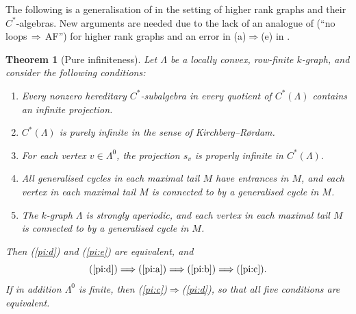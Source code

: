 \documentclass[12pt]{amsart}
\theoremstyle{plain}
\newtheorem{theorem}{Theorem}[section]
\theoremstyle{definition}
\theoremstyle{remark}
\begin{document}
The following is a generalisation of \cite[Theorem 2.3]{HS} in the setting of higher rank graphs and their $C^*$-algebras. New arguments are needed due to the lack of an analogue of \cite[Corollary 2.8]{KPR} (``no loops$\,\Rightarrow\,$AF'') for higher rank graphs  and an error in (a)$\Rightarrow$(e) in \cite[Theorem 2.3]{HS}.
\begin{theorem}[Pure infiniteness]\label{thm:pure-inf}
Let $\Lambda$ be a locally convex, row-finite $k$-graph, and consider the
following conditions:
\begin{enumerate}%
    \item\label{pi:a}
    Every nonzero hereditary $C^*$-subalgebra in every quotient of
    $C^*(\Lambda)$ contains an infinite projection.

    \item\label{pi:b}
    $C^*(\Lambda)$ is purely infinite in the sense of Kirchberg--R\o rdam.

    \item\label{pi:c}
    For each vertex $v\in\Lambda^0$, the projection $s_v$ is properly
    infinite in $C^*(\Lambda)$.

    \item\label{pi:d}
    All generalised cycles in each maximal tail $M$ have entrances in $M$,
    and each vertex in each maximal tail $M$ is connected to by a
    generalised cycle in $M$.

    \item\label{pi:e}
    The $k$-graph $\Lambda$ is strongly aperiodic, and each vertex in each
    maximal tail $M$ is connected to by a generalised cycle in $M$.
\end{enumerate}
Then \textup{(\ref{pi:d})} and \textup{(\ref{pi:e})} are equivalent, and
\[
\textup{(\ref{pi:d})}\Longrightarrow\textup{(\ref{pi:a})}
\Longrightarrow\textup{(\ref{pi:b})}\Longrightarrow\textup{(\ref{pi:c})}.
\]
If in addition $\Lambda^0$ is finite, then
\textup{(\ref{pi:c})}$\Rightarrow$\textup{(\ref{pi:d})}, so that all five
conditions are equivalent.
\end{theorem}
\end{document}
